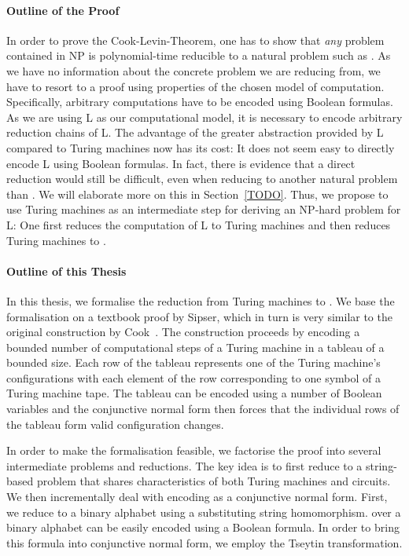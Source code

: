 \paragraph{Outline of the Proof}
In order to prove the Cook-Levin-Theorem, one has to show that \emph{any} problem contained in NP is polynomial-time reducible to a natural problem such as \SAT{}. 
As we have no information about the concrete problem we are reducing from, we have to resort to a proof using properties of the chosen model of computation. 
Specifically, arbitrary computations have to be encoded using Boolean formulas.
As we are using L as our computational model, it is necessary to encode arbitrary reduction chains of L. The advantage of the greater abstraction provided by L compared to Turing machines now has its cost: It does not seem easy to directly encode L using Boolean formulas. In fact, there is evidence that a direct reduction would still be difficult, even when reducing to another natural problem than \SAT{}. We will elaborate more on this in Section~\ref{TODO}.
Thus, we propose to use Turing machines as an intermediate step for deriving an NP-hard problem for L: One first reduces the computation of L to Turing machines and then reduces Turing machines to \SAT{}. 

\paragraph{Outline of this Thesis}
In this thesis, we formalise the reduction from Turing machines to \SAT{}. We base the formalisation on a textbook proof by Sipser\cite{Sipser:TheoryofComputation}, which in turn is very similar to the original construction by Cook~\cite{cook_theorem}. The construction proceeds by encoding a bounded number of computational steps of a Turing machine in a tableau of a bounded size. 
Each row of the tableau represents one of the Turing machine's configurations with each element of the row corresponding to one symbol of a Turing machine tape. The tableau can be encoded using a number of Boolean variables and the conjunctive normal form then forces that the individual rows of the tableau form valid configuration changes.

In order to make the formalisation feasible, we factorise the proof into several intermediate problems and reductions. The key idea is to first reduce to a string-based problem \PR{} that shares characteristics of both Turing machines and circuits. 
We then incrementally deal with encoding \PR{} as a conjunctive normal form. First, we reduce to a binary alphabet using a substituting string homomorphism. 
\PR{} over a binary alphabet can be easily encoded using a Boolean formula. In order to bring this formula into conjunctive normal form, we employ the Tseytin transformation.

